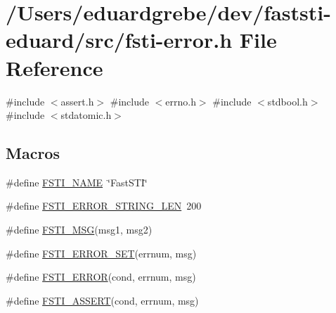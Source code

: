 \hypertarget{fsti-error_8h}{}\section{/\+Users/eduardgrebe/dev/faststi-\/eduard/src/fsti-\/error.h File Reference}
\label{fsti-error_8h}
{\ttfamily \#include $<$assert.\+h$>$}\newline
{\ttfamily \#include $<$errno.\+h$>$}\newline
{\ttfamily \#include $<$stdbool.\+h$>$}\newline
{\ttfamily \#include $<$stdatomic.\+h$>$}\newline
\subsection*{Macros}
\begin{DoxyCompactItemize}
\item 
\#define \mbox{\hyperlink{fsti-error_8h_a923bc1a165ace97dbebe85f8d7edc11f}{F\+S\+T\+I\+\_\+\+N\+A\+ME}}~\char`\"{}Fast\+S\+TI\char`\"{}
\item 
\#define \mbox{\hyperlink{fsti-error_8h_a2c5ec410c3efe4eab60017e594b33bbf}{F\+S\+T\+I\+\_\+\+E\+R\+R\+O\+R\+\_\+\+S\+T\+R\+I\+N\+G\+\_\+\+L\+EN}}~200
\item 
\#define \mbox{\hyperlink{fsti-error_8h_a4452fa8cf807a9553fa2efefb62290c7}{F\+S\+T\+I\+\_\+\+M\+SG}}(msg1,  msg2)
\item 
\#define \mbox{\hyperlink{fsti-error_8h_a661c772e7b1d385f3b4f667ae01905e9}{F\+S\+T\+I\+\_\+\+E\+R\+R\+O\+R\+\_\+\+S\+ET}}(errnum,  msg)
\item 
\#define \mbox{\hyperlink{fsti-error_8h_a1fd6db22083510e321de2ac2f1a14def}{F\+S\+T\+I\+\_\+\+E\+R\+R\+OR}}(cond,  errnum,  msg)
\item 
\#define \mbox{\hyperlink{fsti-error_8h_a45677a0c04d632802de437b7a4cdec01}{F\+S\+T\+I\+\_\+\+A\+S\+S\+E\+RT}}(cond,  errnum,  msg)
\end{DoxyCompactItemize}
